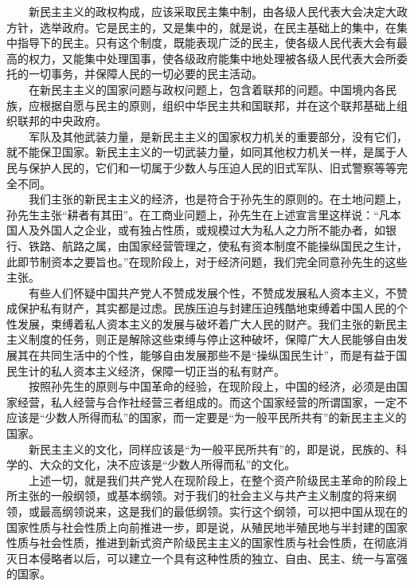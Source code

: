 \documentclass[cn,11pt,chinese]{elegantbook}
\begin{document}
　　新民主主义的政权构成，应该采取民主集中制，由各级人民代表大会决定大政方针，选举政府。它是民主的，又是集中的，就是说，在民主基础上的集中，在集中指导下的民主。只有这个制度，既能表现广泛的民主，使各级人民代表大会有最高的权力，又能集中处理国事，使各级政府能集中地处理被各级人民代表大会所委托的一切事务，并保障人民的一切必要的民主活动。\\
　　在新民主主义的国家问题与政权问题上，包含着联邦的问题。中国境内各民族，应根据自愿与民主的原则，组织中华民主共和国联邦，并在这个联邦基础上组织联邦的中央政府。\\
　　军队及其他武装力量，是新民主主义的国家权力机关的重要部分，没有它们，就不能保卫国家。新民主主义的一切武装力量，如同其他权力机关一样，是属于人民与保护人民的，它们和一切属于少数人与压迫人民的旧式军队、旧式警察等等完全不同。\\
　　我们主张的新民主主义的经济，也是符合于孙先生的原则的。在土地问题上，孙先生主张“耕者有其田”。在工商业问题上，孙先生在上述宣言里这样说：“凡本国人及外国人之企业，或有独占性质，或规模过大为私人之力所不能办者，如银行、铁路、航路之属，由国家经营管理之，使私有资本制度不能操纵国民之生计，此即节制资本之要旨也。”在现阶段上，对于经济问题，我们完全同意孙先生的这些主张。\\
　　有些人们怀疑中国共产党人不赞成发展个性，不赞成发展私人资本主义，不赞成保护私有财产，其实都是过虑。民族压迫与封建压迫残酷地束缚着中国人民的个性发展，束缚着私人资本主义的发展与破坏着广大人民的财产。我们主张的新民主主义制度的任务，则正是解除这些束缚与停止这种破坏，保障广大人民能够自由发展其在共同生活中的个性，能够自由发展那些不是“操纵国民生计”，而是有益于国民生计的私人资本主义经济，保障一切正当的私有财产。\\
　　按照孙先生的原则与中国革命的经验，在现阶段上，中国的经济，必须是由国家经营，私人经营与合作社经营三者组成的。而这个国家经营的所谓国家，一定不应该是“少数人所得而私”的国家，而一定要是“为一般平民所共有”的新民主主义的国家。\\
　　新民主主义的文化，同样应该是“为一般平民所共有”的，即是说，民族的、科学的、大众的文化，决不应该是“少数人所得而私”的文化。\\
　　上述一切，就是我们共产党人在现阶段上，在整个资产阶级民主革命的阶段上所主张的一般纲领，或基本纲领。对于我们的社会主义与共产主义制度的将来纲领，或最高纲领说来，这是我们的最低纲领。实行这个纲领，可以把中国从现在的国家性质与社会性质上向前推进一步，即是说，从殖民地半殖民地与半封建的国家性质与社会性质，推进到新式资产阶级民主主义的国家性质与社会性质，在彻底消灭日本侵略者以后，可以建立一个具有这种性质的独立、自由、民主、统一与富强的国家。\\
\end{document}
